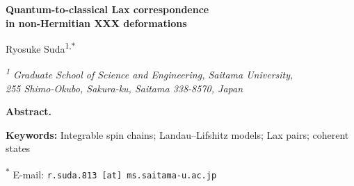 \documentclass[11pt,a4paper]{article}
\numberwithin{equation}{section}
\begin{document}
\hypersetup{pageanchor=false}
\begin{titlepage}
\thispagestyle{empty}
\begin{center}
\vspace*{22mm}
{\Large\bfseries Quantum-to-classical Lax correspondence\\[2mm]
in non-Hermitian XXX deformations\par}
\vspace{16mm}
{\large Ryosuke Suda\textsuperscript{1,\(\ast\)}\par}
\vspace{4mm}
{\normalsize\itshape
\textsuperscript{1} Graduate School of Science and Engineering, Saitama University,\\
255 Shimo-Okubo, Sakura-ku, Saitama 338-8570, Japan\par}
\vspace{18mm}
\end{center}

\noindent\textbf{Abstract.}


\vspace{8mm}
\noindent\textbf{Keywords:} Integrable spin chains; Landau--Lifshitz models;
Lax pairs; coherent states

\vfill
\noindent\textsuperscript{\(\ast\)} E-mail: \texttt{r.suda.813 [at] ms.saitama-u.ac.jp}
\end{titlepage}

\hypersetup{pageanchor=true}
\setcounter{page}{1}









\appendix

\begingroup
\let\appendix\relax

\endgroup

\end{document}
